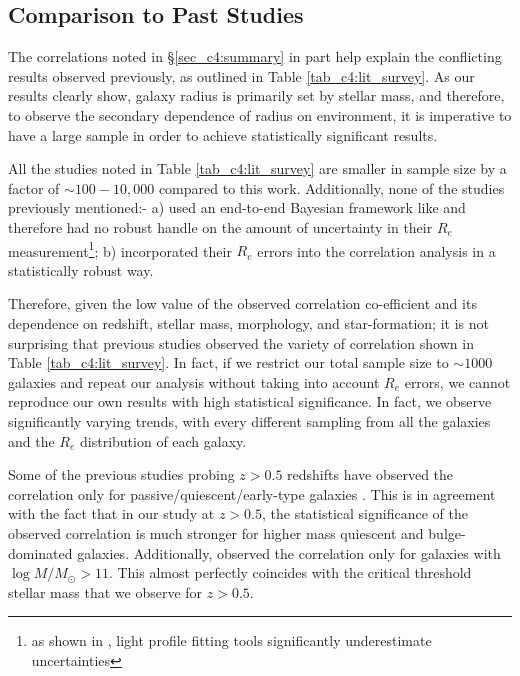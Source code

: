\subsection{Comparison to Past Studies} \label{sec_c4:comp}

The correlations noted in \S \ref{sec_c4:summary} in part help explain the conflicting results observed previously, as outlined in Table \ref{tab_c4:lit_survey}. As our results clearly show, galaxy radius is primarily set by stellar mass, and therefore, to observe the secondary dependence of radius on environment, it is imperative to have a large sample in order to achieve statistically significant results. 

All the studies noted in Table \ref{tab_c4:lit_survey} are smaller in sample size by a factor of $\sim100-10,000$ compared to this work. Additionally, none of the studies previously mentioned:- a) used an end-to-end Bayesian framework like \gampen{} and therefore had no robust handle on the amount of uncertainty in their $R_e$ measurement\footnote{as shown in \citet{hsc_wide_morphs}, light profile fitting tools significantly underestimate uncertainties}; b) incorporated their $R_e$ errors into the correlation analysis in a statistically robust way.

Therefore, given the low value of the observed correlation co-efficient and its dependence on redshift, stellar mass, morphology, and star-formation; it is not surprising that previous studies observed the variety of correlation shown in Table \ref{tab_c4:lit_survey}. In fact, if we restrict our total sample size to $\sim1000$ galaxies and repeat our analysis without taking into account $R_e$ errors, we cannot reproduce our own results with high statistical significance. In fact, we observe significantly varying trends, with every different sampling from all the galaxies and the $R_e$ distribution of each galaxy.

Some of the previous studies probing $z > 0.5$ redshifts have observed the correlation only for passive/quiescent/early-type galaxies \citep[e.g.,][]{Cooper12,Lani13,Bassett13}. This is in agreement with the fact that in our study at $z > 0.5$, the statistical significance of the observed correlation is much stronger for higher mass quiescent and bulge-dominated galaxies. Additionally, \cite[e.g.,][]{Afonso19} observed the correlation only for galaxies with $\log M/M_{\odot} > 11$. This almost perfectly coincides with the critical threshold stellar mass that we observe for $z > 0.5$. 


